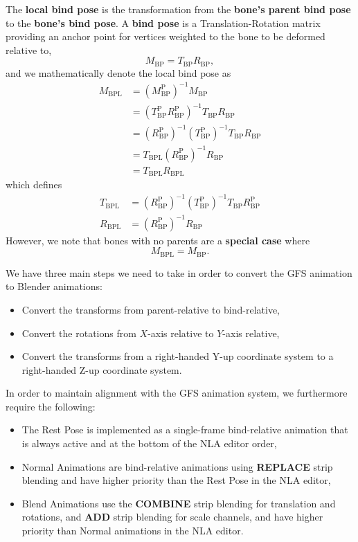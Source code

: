 \documentclass{article}
\begin{document}
The \textbf{local bind pose} is the transformation from the \textbf{bone's parent bind pose} to the \textbf{bone's bind pose}. A \textbf{bind pose} is a Translation-Rotation matrix providing an anchor point for vertices weighted to the bone to be deformed relative to,
\begin{equation}
M_\mathrm{BP} = T_\mathrm{BP}R_\mathrm{BP},
\end{equation}
and we mathematically denote the local bind pose as
\begin{align}
M_\mathrm{BPL} &= \left(M^\mathrm{P}_\mathrm{BP}\right)^{-1} M_\mathrm{BP}\\
 &=  \left(T_\mathrm{BP}^\mathrm{P} R_\mathrm{BP}^\mathrm{P}\right)^{-1} T_\mathrm{BP}R_\mathrm{BP}\\
 &= \left(R_\mathrm{BP}^\mathrm{P}\right)^{-1} \left(T_\mathrm{BP}^\mathrm{P}\right)^{-1} T_\mathrm{BP}R_\mathrm{BP}\\
 &=  T_\mathrm{BPL} \left(R_\mathrm{BP}^\mathrm{P}\right)^{-1} R_\mathrm{BP}\\
 &=  T_\mathrm{BPL} R_\mathrm{BPL}
\end{align}
which defines
\begin{align}
T_\mathrm{BPL} &= \left(R_\mathrm{BP}^\mathrm{P}\right)^{-1} \left(T_\mathrm{BP}^\mathrm{P}\right)^{-1} T_\mathrm{BP} R_\mathrm{BP}^\mathrm{P}\\
R_\mathrm{BPL} &= \left(R_\mathrm{BP}^\mathrm{P}\right)^{-1} R_\mathrm{BP}
\end{align}
However, we note that bones with no parents are a \textbf{special case} where
\begin{equation}
M_\mathrm{BPL} = M_\mathrm{BP}.
\end{equation}

We have three main steps we need to take in order to convert the GFS animation to Blender animations:
\begin{itemize}
\item Convert the transforms from parent-relative to bind-relative,
\item Convert the rotations from $X$-axis relative to $Y$-axis relative,
\item Convert the transforms from a right-handed Y-up coordinate system to a right-handed Z-up coordinate system.
\end{itemize}
In order to maintain alignment with the GFS animation system, we furthermore require the following:
\begin{itemize}
\item The Rest Pose is implemented as a single-frame bind-relative animation that is always active and at the bottom of the NLA editor order,
\item Normal Animations are bind-relative animations using \textbf{REPLACE} strip blending and have higher priority than the Rest Pose in the NLA editor,
\item Blend Animations use the \textbf{COMBINE} strip blending for translation and rotations, and \textbf{ADD} strip blending for scale channels, and have higher priority than Normal animations in the NLA editor.
\end{itemize}
\end{document}

